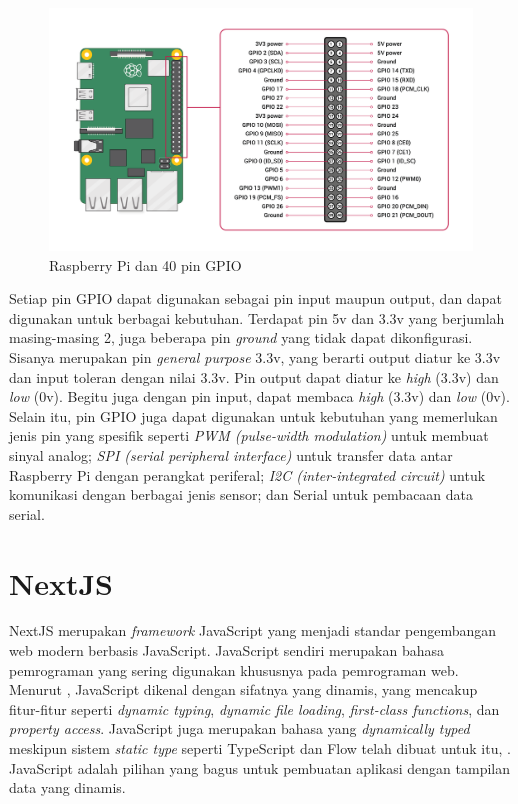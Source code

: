 \begin{figure}[!h]
    \includegraphics[width=0.9\linewidth, center]{images/tinjauan-pustaka/fig-raspy.png}
    \caption{Raspberry Pi dan 40 pin GPIO}
    \label{fig:raspy}
\end{figure}

Setiap pin GPIO dapat digunakan sebagai pin input maupun output, dan dapat digunakan untuk berbagai kebutuhan. Terdapat pin 5v dan 3.3v yang berjumlah masing-masing 2, juga beberapa pin \textit{ground} yang tidak dapat dikonfigurasi. Sisanya merupakan pin \textit{general purpose} 3.3v, yang berarti  output diatur ke 3.3v dan input toleran dengan nilai 3.3v. Pin output dapat diatur ke \textit{high} (3.3v) dan \textit{low} (0v). Begitu juga dengan pin input, dapat membaca \textit{high} (3.3v) dan \textit{low} (0v). Selain itu, pin GPIO juga dapat digunakan untuk kebutuhan yang memerlukan jenis pin yang spesifik seperti \textit{PWM (pulse-width modulation)} untuk membuat sinyal analog; \textit{SPI (serial peripheral interface)} untuk transfer data antar Raspberry Pi dengan perangkat periferal; \textit{I2C (inter-integrated circuit)} untuk komunikasi dengan berbagai jenis sensor; dan Serial untuk pembacaan data serial.

\section{NextJS}

\noindent NextJS merupakan \textit{framework} JavaScript yang menjadi standar pengembangan web modern berbasis JavaScript. JavaScript sendiri merupakan bahasa pemrograman yang sering digunakan khususnya pada pemrograman web. Menurut \textcite{article:tomasdottir}, JavaScript dikenal dengan sifatnya yang dinamis, yang mencakup fitur-fitur seperti \textit{dynamic typing}, \textit{dynamic file loading}, \textit{first-class functions}, dan \textit{property access}. JavaScript juga merupakan bahasa yang \textit{dynamically typed} meskipun sistem \textit{static type} seperti TypeScript dan Flow telah dibuat untuk itu,  \parencite{article:gao}. JavaScript adalah pilihan yang bagus untuk pembuatan aplikasi dengan tampilan data yang dinamis.

